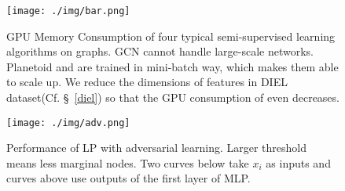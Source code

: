\begin{figure}
	\centering
	\texttt{[image: ./img/bar.png]}
	\caption{GPU Memory Consumption of four typical semi-supervised learning algorithms on graphs. GCN cannot handle large-scale networks. Planetoid and \smodel are trained in mini-batch way, which makes them able to scale up. We reduce the dimensions of features in DIEL dataset(Cf. \S~\ref{diel}) so that the GPU consumption of \smodel even decreases.} \label{bar}
\end{figure}

\begin{figure}
	\centering
	\texttt{[image: ./img/adv.png]}
	\caption{Performance of LP with adversarial learning. Larger threshold means less marginal nodes. Two curves below take $x_i$ as inputs and curves above use outputs of the first layer of MLP. 
	} \label{adv}
\end{figure}
